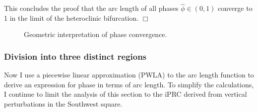 This concludes the proof that the arc length of all phases $\hat{\phi} \in (0,1)$ converge to 1 in the limit of the heteroclinic bifurcation. $\Box$

\begin{figure}[h!]
 \caption[Geometric interpretation of phase convergence]{Geometric interpretation of phase convergence.}
\label{fig:cartoon-convergence-step-fn}\end{figure}





\subsubsection{Division into three distinct regions}
Now I use a piecewise linear approximation (PWLA) to the arc length function to derive an expression for phase in terms of arc length.  To simplify the calculations, I continue to limit the analysis of this section to the iPRC derived from vertical perturbations in the Southwest square.

